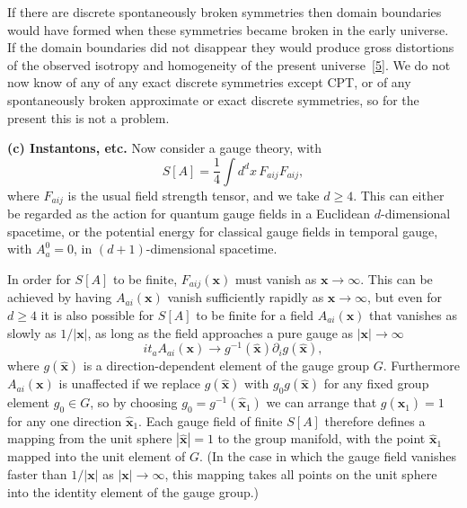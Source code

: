 If there are discrete spontaneously broken symmetries then domain
boundaries would have formed when these symmetries became broken in the
early universe. If the domain boundaries did not disappear they would
produce gross distortions of the observed isotropy and homogeneity of the
present universe~\hyperref[ch23-ref-5]{[5]}. We do not now know of any of
any exact discrete symmetries except CPT, or of any spontaneously broken
approximate or exact discrete symmetries, so for the present this is not a
problem.

\noindent\textbf{(c) Instantons, etc.} Now consider a gauge theory, with
\begin{equation}
 S[A]=\frac{1}{4}\int d^d x\,F_{a ij}F_{a ij},
 \tag{23.1.6}\label{eq:23.1.6}
\end{equation}
where $F_{a ij}$ is the usual field strength tensor, and we take
$d\geq4$. This can either be regarded as the action for quantum gauge
fields in a Euclidean $d$-dimensional spacetime, or the potential energy for
classical gauge fields in temporal gauge, with $A_a^0=0$, in
$(d+1)$-dimensional spacetime.

In order for $S[A]$ to be finite, $F_{a ij}(\mathbf{x})$ must vanish as
$\mathbf{x}\to\infty$. This can be achieved by having
$A_{a i}(\mathbf{x})$ vanish sufficiently rapidly as
$\mathbf{x}\to\infty$, but even for $d\geq4$ it is also possible for $S[A]$
to be finite for a field $A_{a i}(\mathbf{x})$ that vanishes as slowly
as $1/|\mathbf{x}|$, as long as the field approaches a pure gauge as
$|\mathbf{x}|\to\infty$
\begin{equation}
 it_a A_{a i}(\mathbf{x})
 \longrightarrow
 g^{-1}(\hat{\mathbf{x}})\partial_i g(\hat{\mathbf{x}}),
 \tag{23.1.7}\label{eq:23.1.7}
\end{equation}
where $g(\hat{\mathbf{x}})$ is a direction-dependent element of the gauge
group $G$. Furthermore $A_{a i}(\mathbf{x})$ is unaffected if we
replace $g(\hat{\mathbf{x}})$ with $g_0g(\hat{\mathbf{x}})$ for any fixed
group element $g_0\in G$, so by choosing
$g_0=g^{-1}(\hat{\mathbf{x}}_1)$ we can arrange that
$g(\hat{\mathbf{x}}_1)=1$ for any one direction $\hat{\mathbf{x}}_1$. Each
gauge field of finite $S[A]$ therefore defines a mapping from the unit
sphere $|\hat{\mathbf{x}}|=1$ to the group manifold, with the point
$\hat{\mathbf{x}}_1$ mapped into the unit element of $G$. (In the case in
which the gauge field vanishes faster than $1/|\mathbf{x}|$ as
$|\mathbf{x}|\to\infty$, this mapping takes all points on the unit sphere
into the identity element of the gauge group.)

